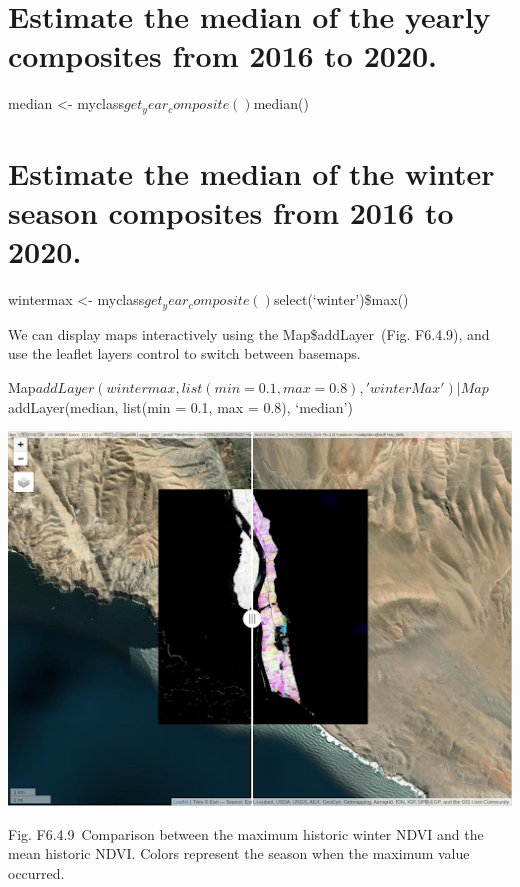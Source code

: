 \documentclass[
  letterpaper,
  DIV=11,
  numbers=noendperiod]{scrreprt}
\begin{document}
\hypertarget{estimate-the-median-of-the-yearly-composites-from-2016-to-2020.}{%
\chapter{Estimate the median of the yearly composites from 2016 to
2020.}\label{estimate-the-median-of-the-yearly-composites-from-2016-to-2020.}}

median \textless- myclass\(get_year_composite()\)median()

\hypertarget{estimate-the-median-of-the-winter-season-composites-from-2016-to-2020.}{%
\chapter{Estimate the median of the winter season composites from 2016
to
2020.}\label{estimate-the-median-of-the-winter-season-composites-from-2016-to-2020.}}

wintermax \textless-
myclass\(get_year_composite()\)select(`winter')\$max()

We can display maps interactively using the Map\$addLayer~(Fig. F6.4.9),
and use the leaflet layers control to switch between basemaps.

Map\(addLayer(wintermax, list(min = 0.1, max = 0.8), 'winterMax') | Map\)addLayer(median,
list(min = 0.1, max = 0.8), `median')

\includegraphics{./F6/image24.png}

Fig. F6.4.9~Comparison between the maximum historic winter NDVI and the
mean historic NDVI. Colors represent the season when the maximum value
occurred.
\end{document}
